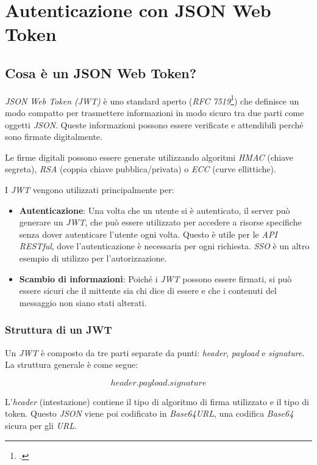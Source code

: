 \chapter{Autenticazione con JSON Web Token}
\label{cap:autenticazione-jwt}


\section{Cosa è un JSON Web Token?}

\emph{JSON Web Token (JWT)} è uno standard aperto (\emph{RFC 7519}\footcite{site:rfc7519}) che definisce un modo compatto per trasmettere informazioni in modo sicuro tra due parti come oggetti \emph{\gls{JSON}}.
Queste informazioni possono essere verificate e attendibili perché sono firmate digitalmente.

Le firme digitali possono essere generate utilizzando algoritmi \emph{\gls{HMAC}} (chiave segreta), \emph{\gls{RSA}} (coppia chiave pubblica/privata) o \emph{\gls{ECC}} (curve ellittiche).

\noindent I \emph{JWT} vengono utilizzati principalmente per:
\begin{itemize}
	\item \textbf{Autenticazione}: Una volta che un utente si è autenticato, il server può generare un \emph{JWT}, che può essere utilizzato per accedere a risorse specifiche senza dover autenticare l'utente ogni volta.
	      Questo è utile per le \emph{API RESTful}, dove l'autenticazione è necessaria per ogni richiesta.
	      \emph{\gls{SSO}} è un altro esempio di utilizzo per l'autorizzazione.
	\item \textbf{Scambio di informazioni}: Poiché i \emph{JWT} possono essere firmati, si può essere sicuri che il mittente sia chi dice di essere e che i contenuti del messaggio non siano stati alterati.
\end{itemize}

\subsection{Struttura di un JWT}
Un \emph{JWT} è composto da tre parti separate da punti: \emph{header}, \emph{payload} e \emph{signature}.
La struttura generale è come segue:

$$header.payload.signature$$

L'\emph{header} (intestazione) contiene il tipo di algoritmo di firma utilizzato e il tipo di token.
Questo \emph{JSON} viene poi codificato in \emph{Base64URL}, una codifica \emph{\gls{Base64}} sicura per gli \emph{\gls{URL}}.


